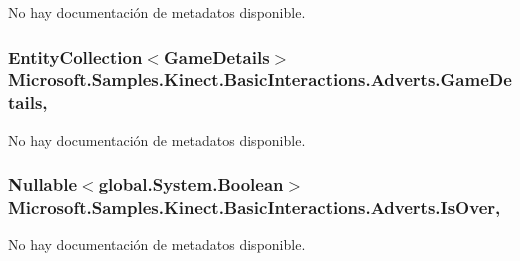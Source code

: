 No hay documentación de metadatos disponible. 

\hypertarget{class_microsoft_1_1_samples_1_1_kinect_1_1_basic_interactions_1_1_adverts_a617ef08affcc4c9c85af478ceb12be3e}{
\subsubsection[{Game\-Details}]{\setlength{\rightskip}{0pt plus 5cm}Entity\-Collection$<${\bf Game\-Details}$>$ Microsoft.\-Samples.\-Kinect.\-Basic\-Interactions.\-Adverts.\-Game\-Details\hspace{0.3cm}{\ttfamily [get]}, {\ttfamily [set]}}}\label{class_microsoft_1_1_samples_1_1_kinect_1_1_basic_interactions_1_1_adverts_a617ef08affcc4c9c85af478ceb12be3e}


No hay documentación de metadatos disponible. 

\hypertarget{class_microsoft_1_1_samples_1_1_kinect_1_1_basic_interactions_1_1_adverts_a62dfaadc97b1098e979a88a7240296ac}{
\subsubsection[{Is\-Over}]{\setlength{\rightskip}{0pt plus 5cm}Nullable$<$global.\-System.\-Boolean$>$ Microsoft.\-Samples.\-Kinect.\-Basic\-Interactions.\-Adverts.\-Is\-Over\hspace{0.3cm}{\ttfamily [get]}, {\ttfamily [set]}}}\label{class_microsoft_1_1_samples_1_1_kinect_1_1_basic_interactions_1_1_adverts_a62dfaadc97b1098e979a88a7240296ac}


No hay documentación de metadatos disponible. 

